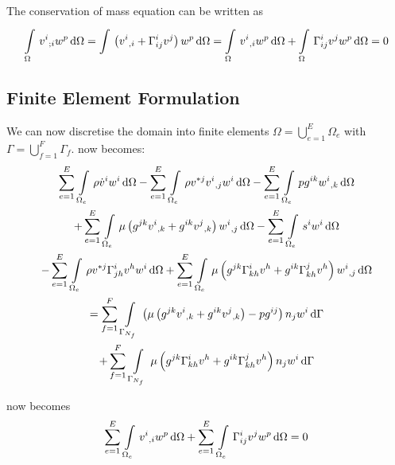 The conservation of mass equation can be written as
\begin{equation}
  \gint{\Omega}{}{\covarderiv{v^{i}}{i}w^{p}}{\Omega}=
  \gint{}{}{\pbrac{\partialderiv{v^{i}}{i}+\christoffel{i}{i}{j}v^{j}}w^{p}}{\Omega}=
  \gint{\Omega}{}{\partialderiv{v^{i}}{i}w^{p}}{\Omega}+\gint{\Omega}{}{\christoffel{i}{i}{j}v^{j}w^{p}}{\Omega}=0
  \label{eqn:TensorStokesMass}
\end{equation}

\subsection{Finite Element Formulation}

We can now discretise the domain into finite elements \ie
$\Omega=\displaystyle{\bigcup_{e=1}^{E}}\Omega_{e}$ with
$\Gamma=\displaystyle{\bigcup_{f=1}^{F}}\Gamma_{f}$.  now
becomes:
\begin{multline}
  \gsum{e=1}{E}{\gint{\Omega_{e}}{}{\rho\dot{v}^{i}w^{i}}{\Omega}}
 -\gsum{e=1}{E}{\gint{\Omega_{e}}{}{\rho v^{*j}\partialderiv{v^{i}}{j}{w^{i}}}{\Omega}}
 -\gsum{e=1}{E}{\gint{\Omega_{e}}{}{pg^{ik}\partialderiv{w^{i}}{k}}{\Omega}}\\
 +\gsum{e=1}{E}{\gint{\Omega_{e}}{}{\mu\pbrac{g^{jk}\partialderiv{v^{i}}{k}+
       g^{ik}\partialderiv{v^{j}}{k}}\partialderiv{w^{i}}{j}}{\Omega}}
 -\gsum{e=1}{E}{\gint{\Omega_{e}}{}{s^{i}w^{i}}{\Omega}}\\
 -\gsum{e=1}{E}{\gint{\Omega_{e}}{}{\rho
     v^{*j}\christoffel{i}{j}{h}v^{h}w^{i}}{\Omega}}
 +\gsum{e=1}{E}{\gint{\Omega_{e}}{}{\mu\pbrac{g^{jk}\christoffel{i}{k}{h}v^{h}+
     g^{ik}\christoffel{j}{k}{h}v^{h}}\partialderiv{w^{i}}{j}}{\Omega}}\\
 =\gsum{f=1}{F}{\gint{\Gamma_{N_{f}}}{}{\pbrac{\mu\pbrac{g^{jk}\partialderiv{v^{i}}{k}+
         g^{ik}\partialderiv{v^{j}}{k}}-pg^{ij}}n_{j}w^{i}}{\Gamma}}\\
 +\gsum{f=1}{F}{\gint{\Gamma_{N_{f}}}{}{\mu\pbrac{g^{jk}\christoffel{i}{k}{h}v^{h}+
       g^{ik}\christoffel{j}{k}{h}v^{h}}n_{j}w^{i}}{\Gamma}}
 \label{eqn:FEMStokesEquationMomentum}
\end{multline}

 now becomes
\begin{equation}
  \gsum{e=1}{E}{\gint{\Omega_{e}}{}{\partialderiv{v^{i}}{i}w^{p}}{\Omega}}
  +\gsum{e=1}{E}{\gint{\Omega_{e}}{}{\christoffel{i}{i}{j}v^{j}w^{p}}{\Omega}}=0
  \label{eqn:FEMStokesEquationMass}
\end{equation}

